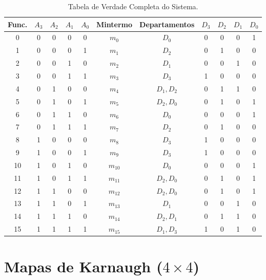 \documentclass[11pt,a4paper]{article}
\begin{document}
\begin{table}[h!]
\centering
\caption{Tabela de Verdade Completa do Sistema.}
\label{tab:verdade}
\vspace{0.2cm}
\begin{tabular}{ccccccccccc}
\toprule
\textbf{Func.} & \textbf{$A_3$} & \textbf{$A_2$} & \textbf{$A_1$} & \textbf{$A_0$} & \textbf{Mintermo} & \textbf{Departamentos} & \textbf{$D_3$} & \textbf{$D_2$} & \textbf{$D_1$} & \textbf{$D_0$} \\
\midrule
\rowcolor{secondary} 0 & 0 & 0 & 0 & 0 & $m_0$ & $D_0$ & 0 & 0 & 0 & 1 \\
1 & 0 & 0 & 0 & 1 & $m_1$ & $D_2$ & 0 & 1 & 0 & 0 \\
\rowcolor{secondary} 2 & 0 & 0 & 1 & 0 & $m_2$ & $D_1$ & 0 & 0 & 1 & 0 \\
3 & 0 & 0 & 1 & 1 & $m_3$ & $D_3$ & 1 & 0 & 0 & 0 \\
\rowcolor{secondary} 4 & 0 & 1 & 0 & 0 & $m_4$ & $D_1, D_2$ & 0 & 1 & 1 & 0 \\
5 & 0 & 1 & 0 & 1 & $m_5$ & $D_2, D_0$ & 0 & 1 & 0 & 1 \\
\rowcolor{secondary} 6 & 0 & 1 & 1 & 0 & $m_6$ & $D_0$ & 0 & 0 & 0 & 1 \\
7 & 0 & 1 & 1 & 1 & $m_7$ & $D_2$ & 0 & 1 & 0 & 0 \\
\rowcolor{secondary} 8 & 1 & 0 & 0 & 0 & $m_8$ & $D_3$ & 1 & 0 & 0 & 0 \\
9 & 1 & 0 & 0 & 1 & $m_9$ & $D_3$ & 1 & 0 & 0 & 0 \\
\rowcolor{secondary} 10 & 1 & 0 & 1 & 0 & $m_{10}$ & $D_0$ & 0 & 0 & 0 & 1 \\
11 & 1 & 0 & 1 & 1 & $m_{11}$ & $D_2, D_0$ & 0 & 1 & 0 & 1 \\
\rowcolor{secondary} 12 & 1 & 1 & 0 & 0 & $m_{12}$ & $D_2, D_0$ & 0 & 1 & 0 & 1 \\
13 & 1 & 1 & 0 & 1 & $m_{13}$ & $D_1$ & 0 & 0 & 1 & 0 \\
\rowcolor{secondary} 14 & 1 & 1 & 1 & 0 & $m_{14}$ & $D_2, D_1$ & 0 & 1 & 1 & 0 \\
15 & 1 & 1 & 1 & 1 & $m_{15}$ & $D_1, D_3$ & 1 & 0 & 1 & 0 \\
\bottomrule
\end{tabular}
\end{table}

\newpage

\section{\texorpdfstring{Mapas de Karnaugh ($4 \times 4$)}{Mapas de Karnaugh (4x4)}}
\end{document}
